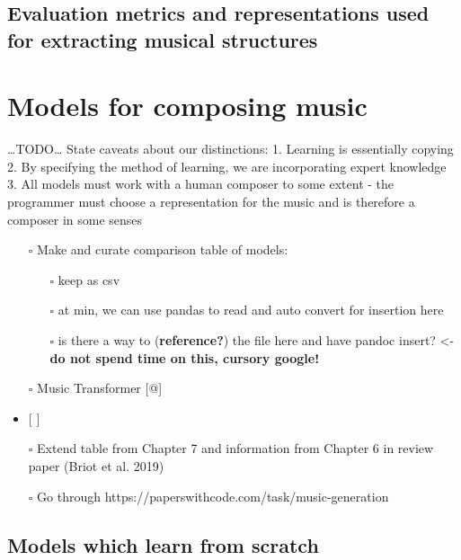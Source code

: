 \documentclass[12pt,a4paper,]{report}
\providecommand{\tightlist}{%
  \setlength{\itemsep}{0pt}\setlength{\parskip}{0pt}}
\begin{document}
\hypertarget{evaluation-metrics-and-representations-used-for-extracting-musical-structures}{%
\subsection{Evaluation metrics and representations used for extracting
musical
structures}\label{evaluation-metrics-and-representations-used-for-extracting-musical-structures}}

\hypertarget{models-for-composing-music}{%
\section{Models for composing music}\label{models-for-composing-music}}

\ldots TODO\ldots{} State caveats about our distinctions: 1. Learning is
essentially copying 2. By specifying the method of learning, we are
incorporating expert knowledge 3. All models must work with a human
composer to some extent - the programmer must choose a representation
for the music and is therefore a composer in some senses

\begin{itemize}
\tightlist
\item[$\square$]
  Make and curate comparison table of models:

  \begin{itemize}
  \tightlist
  \item[$\square$]
    keep as csv
  \item[$\square$]
    at min, we can use pandas to read and auto convert for insertion
    here
  \item[$\square$]
    is there a way to (\textbf{reference?}) the file here and have
    pandoc insert? \textless- \textbf{do not spend time on this, cursory
    google!}
  \end{itemize}
\item[$\square$]
  Music Transformer {[}@{]}
\item
  {[} {]}
\item[$\square$]
  Extend table from Chapter 7 and information from Chapter 6 in review
  paper (Briot et al. 2019)
\item[$\square$]
  Go through https://paperswithcode.com/task/music-generation
\end{itemize}

\hypertarget{models-which-learn-from-scratch}{%
\subsection{Models which learn from
scratch}\label{models-which-learn-from-scratch}}
\end{document}

